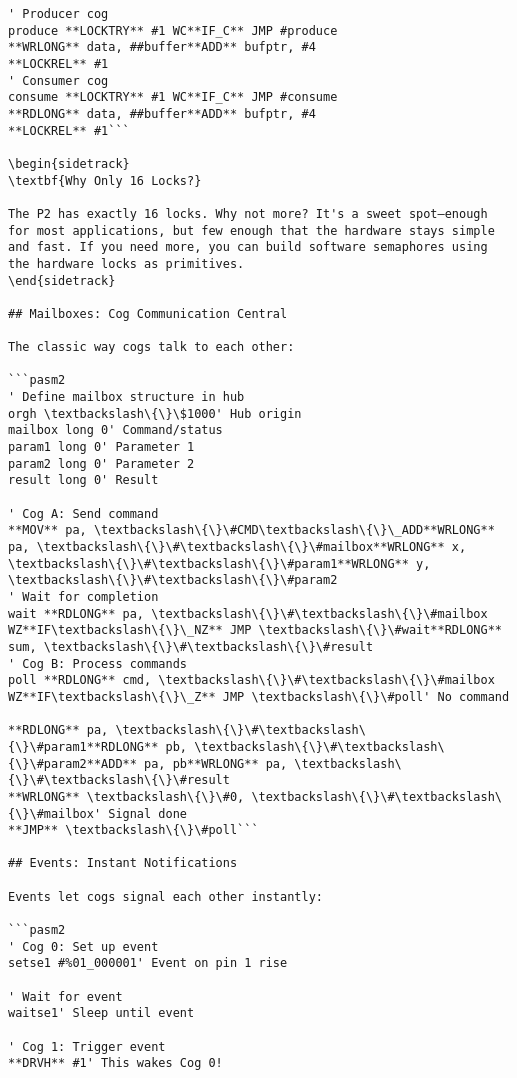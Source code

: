 \documentclass[11pt]{book}
\begin{document}
\begin{lstlisting}
' Producer cog
produce **LOCKTRY** #1 WC**IF_C** JMP #produce        
**WRLONG** data, ##buffer**ADD** bufptr, #4        
**LOCKREL** #1
' Consumer cog  
consume **LOCKTRY** #1 WC**IF_C** JMP #consume        
**RDLONG** data, ##buffer**ADD** bufptr, #4        
**LOCKREL** #1```

\begin{sidetrack}
\textbf{Why Only 16 Locks?}

The P2 has exactly 16 locks. Why not more? It's a sweet spot—enough for most applications, but few enough that the hardware stays simple and fast. If you need more, you can build software semaphores using the hardware locks as primitives.
\end{sidetrack}

## Mailboxes: Cog Communication Central

The classic way cogs talk to each other:

```pasm2
' Define mailbox structure in hub
orgh \textbackslash\{\}\$1000' Hub origin
mailbox long 0' Command/status
param1 long 0' Parameter 1
param2 long 0' Parameter 2  
result long 0' Result

' Cog A: Send command
**MOV** pa, \textbackslash\{\}\#CMD\textbackslash\{\}\_ADD**WRLONG** pa, \textbackslash\{\}\#\textbackslash\{\}\#mailbox**WRLONG** x, \textbackslash\{\}\#\textbackslash\{\}\#param1**WRLONG** y, \textbackslash\{\}\#\textbackslash\{\}\#param2        
' Wait for completion
wait **RDLONG** pa, \textbackslash\{\}\#\textbackslash\{\}\#mailbox WZ**IF\textbackslash\{\}\_NZ** JMP \textbackslash\{\}\#wait**RDLONG** sum, \textbackslash\{\}\#\textbackslash\{\}\#result
' Cog B: Process commands
poll **RDLONG** cmd, \textbackslash\{\}\#\textbackslash\{\}\#mailbox WZ**IF\textbackslash\{\}\_Z** JMP \textbackslash\{\}\#poll' No command
        
**RDLONG** pa, \textbackslash\{\}\#\textbackslash\{\}\#param1**RDLONG** pb, \textbackslash\{\}\#\textbackslash\{\}\#param2**ADD** pa, pb**WRLONG** pa, \textbackslash\{\}\#\textbackslash\{\}\#result        
**WRLONG** \textbackslash\{\}\#0, \textbackslash\{\}\#\textbackslash\{\}\#mailbox' Signal done
**JMP** \textbackslash\{\}\#poll```

## Events: Instant Notifications

Events let cogs signal each other instantly:

```pasm2
' Cog 0: Set up event
setse1 #%01_000001' Event on pin 1 rise
        
' Wait for event
waitse1' Sleep until event

' Cog 1: Trigger event
**DRVH** #1' This wakes Cog 0!
\end{lstlisting}
\end{document}
